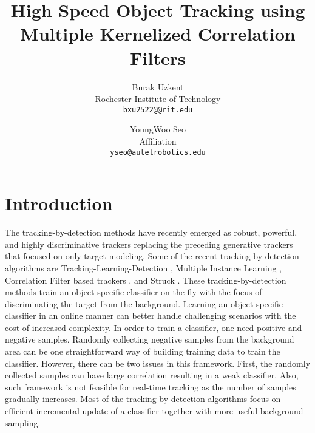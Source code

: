 \documentclass[10pt,twocolumn,letterpaper]{article}
\begin{document}
\title{High Speed Object Tracking using Multiple Kernelized Correlation Filters}

\author{Burak Uzkent\\
Rochester Institute of Technology\\
{\tt\small bxu2522@@rit.edu}
\and
YoungWoo Seo\\
Affiliation\\
{\tt\small yseo@autelrobotics.edu}
}

\maketitle

\begin{abstract}

\end{abstract}

\section{Introduction}
The tracking-by-detection methods have recently emerged as robust, powerful, and highly discriminative trackers replacing the preceding generative trackers that focused on only target modeling. Some of the recent tracking-by-detection algorithms are Tracking-Learning-Detection \cite{kalal2012tracking}, Multiple Instance Learning \cite{babenko2009visual}, Correlation Filter based trackers \cite{bolme2010visual,henriques2015high}, and Struck \cite{hare2012efficient}. These tracking-by-detection methods train an object-specific classifier on the fly with the focus of discriminating the target from the background. Learning an object-specific classifier in an online manner can better handle challenging scenarios with the cost of increased complexity. In order to train a classifier, one need positive and negative samples. Randomly collecting negative samples from the background area can be one straightforward way of building training data to train the classifier. However, there can be two issues in this framework. First, the randomly collected samples can have large correlation resulting in a weak classifier. Also, such framework is not feasible for real-time tracking as the number of samples gradually increases. Most of the tracking-by-detection algorithms focus on efficient incremental update of a classifier together with more useful background sampling. 
\end{document}
